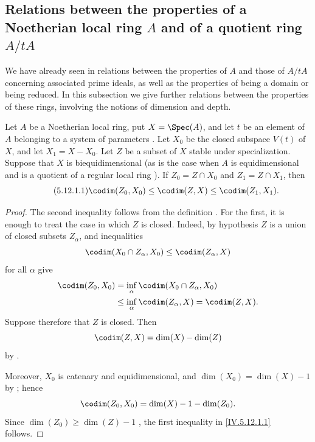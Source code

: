 \subsection{Relations between the properties of a Noetherian local
ring \texorpdfstring{$A$}{A} and of a quotient ring
\texorpdfstring{$A/tA$}{A/tA}}
\label{subsection:IV.5.12}
\label{IV.5.12}


We have already seen in  relations between the
properties of $A$ and those of $A/tA$ concerning associated prime
ideals, as well as the properties of being a domain or being
reduced.  In this subsection we give further relations between the
properties of these rings, involving the notions of dimension and
depth.

\begin{proposition}[5.12.1]
\label{IV.5.12.1}
Let $A$ be a Noetherian local ring, put $X=\Spec(A)$, and let $t$
be an element of $A$ belonging to a system of parameters
.  Let $X_0$ be the closed subspace $V(t)$ of
$X$, and let $X_1=X-X_0$.  Let $Z$ be a subset of $X$ stable
under specialization.  Suppose that $X$ is biequidimensional
(as is the case when $A$ is equidimensional and is a quotient of
a regular local ring ).  If
$Z_0=Z\cap X_0$ and $Z_1=Z\cap X_1$, then
\begin{equation}
\tag{5.12.1.1}
\label{IV.5.12.1.1}
  \codim(Z_0,X_0)\leq\codim(Z,X)\leq\codim(Z_1,X_1).
\end{equation}
\end{proposition}

\begin{proof}
The second inequality follows from the definition
.  For the first, it is enough to treat the case
in which $Z$ is closed.  Indeed, by hypothesis $Z$ is a union of
closed subsets $Z_\alpha$, and inequalities
\[
  \codim(X_0\cap Z_\alpha,X_0)\leq\codim(Z_\alpha,X)
\]
for all $\alpha$ give
\[
\begin{split}
  \codim(Z_0,X_0)
  &=\inf_\alpha\codim(X_0\cap Z_\alpha,X_0)\\
  &\leq\inf_\alpha\codim(Z_\alpha,X)
   =\codim(Z,X).
\end{split}
\]
Suppose therefore that $Z$ is closed.  Then
\[
  \codim(Z,X)=\dim(X)-\dim(Z)
\]
by .


Moreover, $X_0$ is catenary and equidimensional, and
$\dim(X_0)=\dim(X)-1$ by ; hence
\[
  \codim(Z_0,X_0)
  =\dim(X)-1-\dim(Z_0).
\]
Since $\dim(Z_0)\geq\dim(Z)-1$ , the first
inequality in \eqref{IV.5.12.1.1} follows.
\end{proof}

